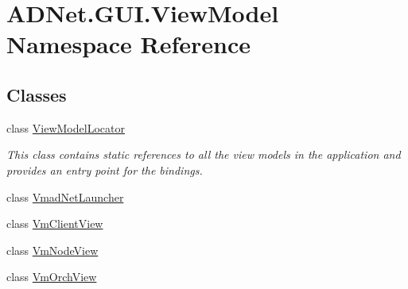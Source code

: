 \hypertarget{namespace_a_d_net_1_1_g_u_i_1_1_view_model}{}\section{A\+D\+Net.\+G\+U\+I.\+View\+Model Namespace Reference}
\label{namespace_a_d_net_1_1_g_u_i_1_1_view_model}
\subsection*{Classes}
\begin{DoxyCompactItemize}
\item 
class \hyperlink{class_a_d_net_1_1_g_u_i_1_1_view_model_1_1_view_model_locator}{View\+Model\+Locator}
\begin{DoxyCompactList}\small\item\em This class contains static references to all the view models in the application and provides an entry point for the bindings. \end{DoxyCompactList}\item 
class \hyperlink{class_a_d_net_1_1_g_u_i_1_1_view_model_1_1_vmad_net_launcher}{Vmad\+Net\+Launcher}
\item 
class \hyperlink{class_a_d_net_1_1_g_u_i_1_1_view_model_1_1_vm_client_view}{Vm\+Client\+View}
\item 
class \hyperlink{class_a_d_net_1_1_g_u_i_1_1_view_model_1_1_vm_node_view}{Vm\+Node\+View}
\item 
class \hyperlink{class_a_d_net_1_1_g_u_i_1_1_view_model_1_1_vm_orch_view}{Vm\+Orch\+View}
\end{DoxyCompactItemize}
